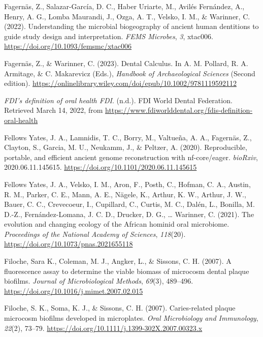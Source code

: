 \documentclass[
  letterpaper,
]{book}
\newlength{\cslhangindent}
\newlength{\cslentryspacingunit} %
\newenvironment{CSLReferences}[2] %
 {%
  \setlength{\parindent}{0pt}
  \ifodd #1
  \let\oldpar\par
  \def\par{\hangindent=\cslhangindent\oldpar}
  \fi
  \setlength{\parskip}{#2\cslentryspacingunit}
 }%
 {}
\begin{document}
\begin{CSLReferences}{1}{0}
\leavevmode{}%
Fagernäs, Z., Salazar-García, D. C., Haber Uriarte, M., Avilés
Fernández, A., Henry, A. G., Lomba Maurandi, J., Ozga, A. T., Velsko, I.
M., \& Warinner, C. (2022). Understanding the microbial biogeography of
ancient human dentitions to guide study design and interpretation.
\emph{FEMS Microbes}, \emph{3}, xtac006.
\url{https://doi.org/10.1093/femsmc/xtac006}

\leavevmode{}%
Fagernäs, Z., \& Warinner, C. (2023). Dental {Calculus}. In A. M.
Pollard, R. A. Armitage, \& C. Makarevicz (Eds.), \emph{Handbook of
{Archaeological Sciences}} (Second edition).
\url{https://onlinelibrary.wiley.com/doi/epub/10.1002/9781119592112}

\leavevmode{}%
\emph{{FDI}'s definition of oral health \textbar{} {FDI}}. (n.d.). {FDI
World Dental Federation}. Retrieved March 14, 2022, from
\url{https://www.fdiworlddental.org/fdis-definition-oral-health}

\leavevmode{}%
Fellows Yates, J. A., Lamnidis, T. C., Borry, M., Valtueña, A. A.,
Fagernäs, Z., Clayton, S., Garcia, M. U., Neukamm, J., \& Peltzer, A.
(2020). Reproducible, portable, and efficient ancient genome
reconstruction with nf-core/eager. \emph{bioRxiv}, 2020.06.11.145615.
\url{https://doi.org/10.1101/2020.06.11.145615}

\leavevmode{}%
Fellows Yates, J. A., Velsko, I. M., Aron, F., Posth, C., Hofman, C. A.,
Austin, R. M., Parker, C. E., Mann, A. E., Nägele, K., Arthur, K. W.,
Arthur, J. W., Bauer, C. C., Crevecoeur, I., Cupillard, C., Curtis, M.
C., Dalén, L., Bonilla, M. D.-Z., Fernández-Lomana, J. C. D., Drucker,
D. G., \ldots{} Warinner, C. (2021). The evolution and changing ecology
of the {African} hominid oral microbiome. \emph{Proceedings of the
National Academy of Sciences}, \emph{118}(20).
\url{https://doi.org/10.1073/pnas.2021655118}

\leavevmode{}%
Filoche, Sara K., Coleman, M. J., Angker, L., \& Sissons, C. H. (2007).
A fluorescence assay to determine the viable biomass of microcosm dental
plaque biofilms. \emph{Journal of Microbiological Methods},
\emph{69}(3), 489--496.
\url{https://doi.org/10.1016/j.mimet.2007.02.015}

\leavevmode{}%
Filoche, S. K., Soma, K. J., \& Sissons, C. H. (2007). Caries-related
plaque microcosm biofilms developed in microplates. \emph{Oral
Microbiology and Immunology}, \emph{22}(2), 73--79.
\url{https://doi.org/10.1111/j.1399-302X.2007.00323.x}


\end{CSLReferences}
\end{document}
